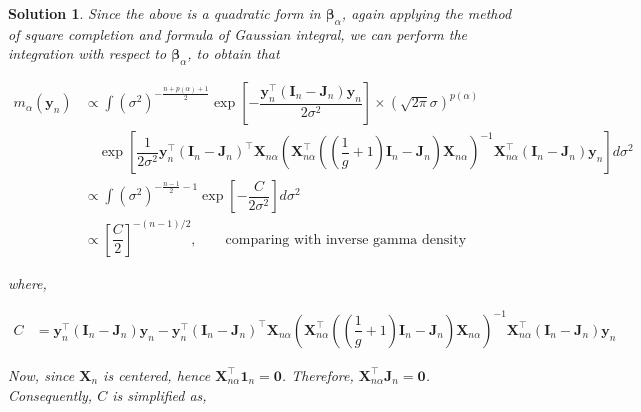 \documentclass[12pt]{article}
\theoremstyle{problemstyle}
\newtheorem*{solution*}{Solution}
\newcommand{\bb}[1]{\boldsymbol{#1}}
\newcommand{\transpose}{^\intercal}
\begin{document}
\begin{solution*}
    Since the above is a quadratic form in $\bb{\beta}_\alpha$, again applying the method of square completion and formula of Gaussian integral, we can perform the integration with respect to $\bb{\beta}_\alpha$, to obtain that

    \begin{align*}
        m_\alpha(\bb{y}_n) 
        & \propto \int (\sigma^2)^{-\frac{n + p(\alpha) + 1}{2}} \exp\left[ -\dfrac{\bb{y}_n \transpose (\bb{I}_n - \bb{J}_n) \bb{y}_n}{2\sigma^2} \right] \times (\sqrt{2\pi} \sigma)^{p(\alpha)} \\
        & \quad \exp\left[ \dfrac{1}{2\sigma^2} \bb{y}_n\transpose (\bb{I}_n - \bb{J}_n)\transpose \bb{X}_{n\alpha} \left( \bb{X}_{n\alpha}\transpose \left( \left( \dfrac{1}{g} + 1 \right)\bb{I}_n - \bb{J}_n \right) \bb{X}_{n\alpha} \right)^{-1} \bb{X}_{n\alpha}\transpose  (\bb{I}_n - \bb{J}_n) \bb{y}_n \right] d\sigma^2\\
        & \propto \int (\sigma^2)^{-\frac{n - 1}{2} - 1} \exp\left[ -\dfrac{C}{2\sigma^2} \right] d\sigma^2\\
        & \propto \left[\dfrac{C}{2}\right]^{-(n-1)/2}, \qquad \text{comparing with inverse gamma density}
    \end{align*}

    where,

    \begin{align*}
        C
        & = \bb{y}_n \transpose (\bb{I}_n - \bb{J}_n) \bb{y}_n - \bb{y}_n\transpose (\bb{I}_n - \bb{J}_n)\transpose \bb{X}_{n\alpha} \left( \bb{X}_{n\alpha}\transpose \left( \left( \dfrac{1}{g} + 1 \right)\bb{I}_n - \bb{J}_n \right) \bb{X}_{n\alpha} \right)^{-1} \bb{X}_{n\alpha}\transpose  (\bb{I}_n - \bb{J}_n) \bb{y}_n
    \end{align*}

    Now, since $\bb{X}_n$ is centered, hence $\bb{X}_{n\alpha}\transpose \bb{1}_n = \bb{0}$. Therefore, $\bb{X}_{n\alpha}\transpose \bb{J}_n = \bb{0}$. Consequently, $C$ is simplified as,
    

\end{solution*}
\end{document}
